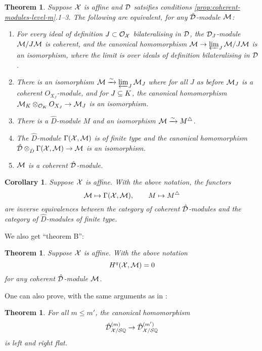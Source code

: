 \documentclass{article}
\theoremstyle{change}
\newtheorem{thm}[subsubsection]{Theorem}
\newtheorem{cor}[subsubsection]{Corollary}
\numberwithin{equation}{subsubsection}
\begin{document}
\begin{thm}\label{thm:theorem-A}
  Suppose ${\cal X}$ is affine and ${\cal D}$ satsifies conditions
  \ref{prop:coherent-modules-level-m}.1--3. The following are
  equivalent, for any $\hat{\cal D}$-module ${\cal M}$:
  \begin{enumerate}
  \item For every ideal of definition $J\subset{\cal O}_{\cal X}$ bilateralising
    in ${\cal D}$, the ${\cal D}_J$-module ${\cal M}/J{\cal M}$ is coherent, and the
    canonical homomorphism ${\cal M}\to\varprojlim_J{\cal M}/J{\cal M}$ is an
    isomorphism, where the limit is over ideals of definition
    bilateralising in ${\cal D}$.
  \item There is an isomorphism ${\cal M}\xrightarrow{\sim}\varprojlim_J{\cal M}_J$ where for all
    $J$ as before ${\cal M}_J$ is a coherent $O_{X_J}$-module, and for
    $J\subseteq K$, the canonical homomorphism
    ${\cal M}_K\otimes_{{\cal O}_K}O_{X_J}\to {\cal M}_J$ is an isomorphism.
  \item There is a $\hat D$-module $M$ and an isomorphism ${\cal M}\xrightarrow{\sim}
    M^\triangle$.
  \item The $\hat D$-module $\Gamma({\cal X},{\cal M})$ is of finite type and
    the canonical homomorphism
    $\hat{\cal D}\otimes_{\hat D}\Gamma({\cal X},{\cal M})\to{\cal M}$ is an isomorphism.
  \item ${\cal M}$ is a coherent $\hat{\cal D}$-module.    
  \end{enumerate}
\end{thm}

\begin{cor}
  Suppose ${\cal X}$ is affine. With the above notation, the functors
  \begin{displaymath}
    {\cal M}\mapsto\Gamma({\cal X},{\cal M}),
    \qquad
    M\mapsto M^\triangle
  \end{displaymath}
  are inverse equivalences between the category of coherent
  $\hat{\cal D}$-modules and the category of $\hat D$-modules of finite type.
\end{cor}

We also get ``theorem B'':

\begin{thm}\label{thm:thmB}
  Suppose ${\cal X}$ is affine. With the above notation
  \begin{displaymath}
    H^q({\cal X},{\cal M})=0
  \end{displaymath}
  for any coherent $\hat{\cal D}$-module ${\cal M}$.
\end{thm}

One can also prove, with the same arguments as in
\cite[\S3.5]{berthelot:1996}: 

\begin{thm}\label{thm:flatness-change-of-m}
  For all $m\le m'$, the canonical homomorphism
  \begin{displaymath}
    {\hat{\cal D}}^{({m})}_{{\cal X}/{\cal S}{\mathbb Q}}\to{\hat{\cal D}}^{({m'})}_{{\cal X}/{\cal S}{\mathbb Q}}
  \end{displaymath}
  is left and right flat.
\end{thm}
\end{document}
